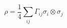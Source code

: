 \begin{equation}\label{eqn:rho_2}
   \rho = \frac{1}{4}\sum_{ij} \Gamma_{ij} \sigma_i \otimes \sigma_j
\end{equation}
